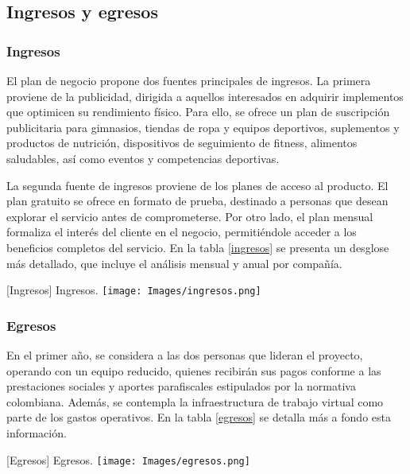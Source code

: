 \subsection{Ingresos y egresos}

\subsubsection{Ingresos}

El plan de negocio propone dos fuentes principales de ingresos. La primera proviene de la publicidad, dirigida a aquellos interesados en adquirir implementos que optimicen su rendimiento físico. Para ello, se ofrece un plan de suscripción publicitaria para gimnasios, tiendas de ropa y equipos deportivos, suplementos y productos de nutrición, dispositivos de seguimiento de fitness, alimentos saludables, así como eventos y competencias deportivas.

La segunda fuente de ingresos proviene de los planes de acceso al producto. El plan gratuito se ofrece en formato de prueba, destinado a personas que desean explorar el servicio antes de comprometerse. Por otro lado, el plan mensual formaliza el interés del cliente en el negocio, permitiéndole acceder a los beneficios completos del servicio. En la tabla \ref{ingresos} se presenta un desglose más detallado, que incluye el análisis mensual y anual por compañía.

\vspace{2mm}
\begin{minipage}{0.9\textwidth}
\centering
{}[{Ingresos}]{ Ingresos. }
\label{ingresos}
\texttt{[image: Images/ingresos.png]}
\end{minipage}


\subsubsection{Egresos}
En el primer año, se considera a las dos personas que lideran el proyecto, operando con un equipo reducido, quienes recibirán sus pagos conforme a las prestaciones sociales y aportes parafiscales estipulados por la normativa colombiana. Además, se contempla la infraestructura de trabajo virtual como parte de los gastos operativos. En la tabla \ref{egresos} se detalla más a fondo esta información.

\vspace{2mm}
\begin{minipage}{0.9\textwidth}
\centering
{}[{Egresos}]{ Egresos. }
\label{egresos}
\texttt{[image: Images/egresos.png]}
\end{minipage}